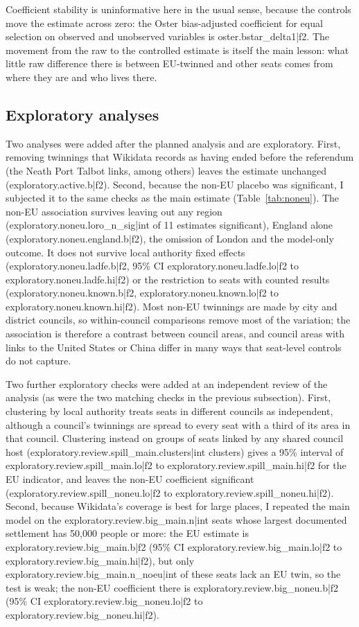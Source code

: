 \documentclass[11pt,a4paper]{article}
\begin{document}
Coefficient stability is uninformative here in the usual sense, because the controls move the estimate across zero: the Oster bias-adjusted coefficient for equal selection on observed and unobserved variables is {{oster.bstar_delta1|f2}}. The movement from the raw to the controlled estimate is itself the main lesson: what little raw difference there is between EU-twinned and other seats comes from where they are and who lives there.

\subsection{Exploratory analyses}
Two analyses were added after the planned analysis and are exploratory. First, removing twinnings that Wikidata records as having ended before the referendum (the Neath Port Talbot links, among others) leaves the estimate unchanged ({{exploratory.active.b|f2}}). Second, because the non-EU placebo was significant, I subjected it to the same checks as the main estimate (Table~\ref{tab:noneu}). The non-EU association survives leaving out any region ({{exploratory.noneu.loro_n_sig|int}} of 11 estimates significant), England alone ({{exploratory.noneu.england.b|f2}}), the omission of London and the model-only outcome. It does not survive local authority fixed effects ({{exploratory.noneu.ladfe.b|f2}}, 95\% CI {{exploratory.noneu.ladfe.lo|f2}} to {{exploratory.noneu.ladfe.hi|f2}}) or the restriction to seats with counted results ({{exploratory.noneu.known.b|f2}}, {{exploratory.noneu.known.lo|f2}} to {{exploratory.noneu.known.hi|f2}}). Most non-EU twinnings are made by city and district councils, so within-council comparisons remove most of the variation; the association is therefore a contrast between council areas, and council areas with links to the United States or China differ in many ways that seat-level controls do not capture.

Two further exploratory checks were added at an independent review of the analysis (as were the two matching checks in the previous subsection). First, clustering by local authority treats seats in different councils as independent, although a council's twinnings are spread to every seat with a third of its area in that council. Clustering instead on groups of seats linked by any shared council host ({{exploratory.review.spill_main.clusters|int}} clusters) gives a 95\% interval of {{exploratory.review.spill_main.lo|f2}} to {{exploratory.review.spill_main.hi|f2}} for the EU indicator, and leaves the non-EU coefficient significant ({{exploratory.review.spill_noneu.lo|f2}} to {{exploratory.review.spill_noneu.hi|f2}}). Second, because Wikidata's coverage is best for large places, I repeated the main model on the {{exploratory.review.big_main.n|int}} seats whose largest documented settlement has 50,000 people or more: the EU estimate is {{exploratory.review.big_main.b|f2}} (95\% CI {{exploratory.review.big_main.lo|f2}} to {{exploratory.review.big_main.hi|f2}}), but only {{exploratory.review.big_main.n_noeu|int}} of these seats lack an EU twin, so the test is weak; the non-EU coefficient there is {{exploratory.review.big_noneu.b|f2}} (95\% CI {{exploratory.review.big_noneu.lo|f2}} to {{exploratory.review.big_noneu.hi|f2}}).
\end{document}
